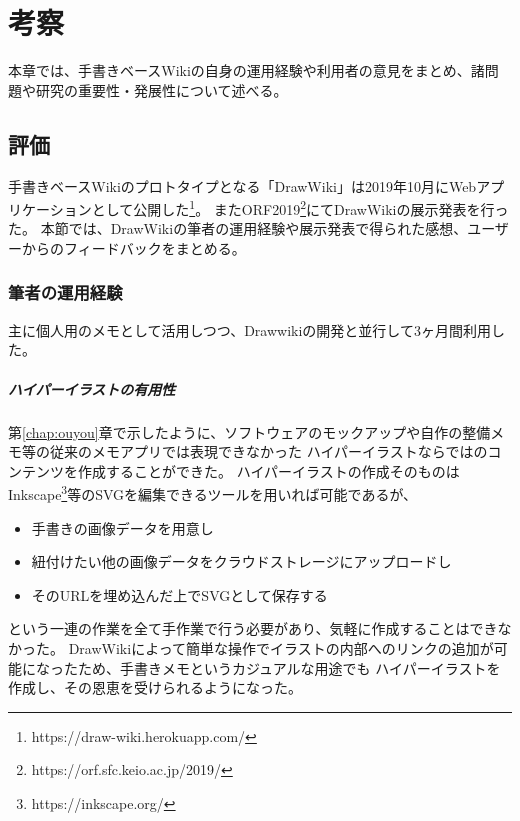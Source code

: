 \chapter{考察}
\label{chap:kosatsu}

本章では、手書きベースWikiの自身の運用経験や利用者の意見をまとめ、諸問題や研究の重要性・発展性について述べる。

\newpage

\section{評価}
手書きベースWikiのプロトタイプとなる「DrawWiki」は2019年10月にWebアプリケーションとして公開した\footnote{ \textsf{https://draw-wiki.herokuapp.com/} }。
またORF2019\footnote{ \textsf{https://orf.sfc.keio.ac.jp/2019/} }にてDrawWikiの展示発表を行った。
本節では、DrawWikiの筆者の運用経験や展示発表で得られた感想、ユーザーからのフィードバックをまとめる。

\subsection{筆者の運用経験}
主に個人用のメモとして活用しつつ、Drawwikiの開発と並行して3ヶ月間利用した。


\paragraph*{ハイパーイラストの有用性}
第\ref{chap:ouyou}章で示したように、ソフトウェアのモックアップや自作の整備メモ等の従来のメモアプリでは表現できなかった
ハイパーイラストならではのコンテンツを作成することができた。
ハイパーイラストの作成そのものはInkscape\footnote{https://inkscape.org/}等のSVGを編集できるツールを用いれば可能であるが、
\begin{itemize}
    \item 手書きの画像データを用意し
    \item 紐付けたい他の画像データをクラウドストレージにアップロードし
    \item そのURLを埋め込んだ上でSVGとして保存する
\end{itemize}
という一連の作業を全て手作業で行う必要があり、気軽に作成することはできなかった。
DrawWikiによって簡単な操作でイラストの内部へのリンクの追加が可能になったため、手書きメモというカジュアルな用途でも
ハイパーイラストを作成し、その恩恵を受けられるようになった。

